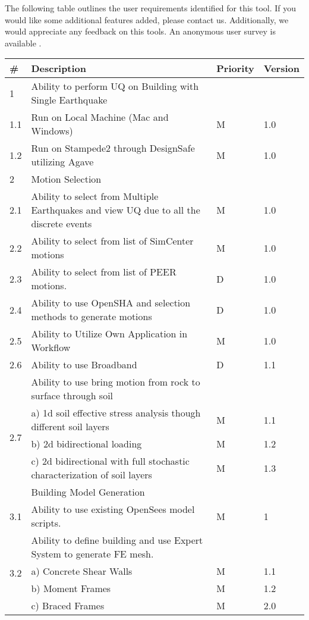 The following table outlines the user requirements identified for this
tool. If you would like some additional features added, please contact us.
Additionally, we would appreciate any feedback on this tools. An anonymous
user survey is available .

\begin{table}[hbt!]                 
  \centering
\begin{adjustbox}{max width=\textwidth}            
  \begin{tabular}{llll}                    
    \toprule          
      \# & Description & Priority & Version \\ \hline
    
      1 & Ability to perform UQ on Building with Single Earthquake &  &  \\ \hline
	1.1 & Run on Local Machine (Mac and Windows) & M & 1.0 \\ \hline
	1.2 & Run on Stampede2 through DesignSafe utilizing Agave & M & 1.0 \\ \hline
	2 & Motion Selection &  &  \\ \hline
	2.1 & Ability to select from Multiple Earthquakes and view UQ due to all the discrete events & M & 1.0  \\ \hline
	2.2 & Ability to select from list of SimCenter motions & M & 1.0 \\ \hline
	2.3 & Ability to select from list of PEER motions. & D & 1.0 \\ \hline
	2.4 & Ability to use OpenSHA and selection methods to generate motions & D & 1.0 \\ \hline
	2.5 & Ability to Utilize Own Application in Workflow & M & 1.0 \\ \hline
	2.6 & Ability to use Broadband & D & 1.1 \\ \hline
	\multirow{5}{*}{2.7} 
	& Ability to use bring motion from rock to surface through soil &  &  \\ 
	 & a)     1d soil effective stress analysis though different soil layers & M & 1.1  \\ 
	 & b)     2d bidirectional loading & M & 1.2 \\ 
	 & c)     2d bidirectional with full stochastic characterization of soil layers & M & 1.3 \\ \hline

	3 & Building Model Generation &  &  \\ \hline
	3.1 & Ability to use existing OpenSees model scripts. & M & 1 \\ \hline
	\multirow{5}{*}{3.2}  & Ability to define building and use Expert System to generate FE mesh. &  &  \\
	 & a)     Concrete Shear Walls & M & 1.1 \\ 
	 & b)     Moment Frames & M & 1.2 \\ 
	 & c)     Braced Frames & M & 2.0  \\ \hline
	 

\end{tabular}
\end{adjustbox}
\end{table}
